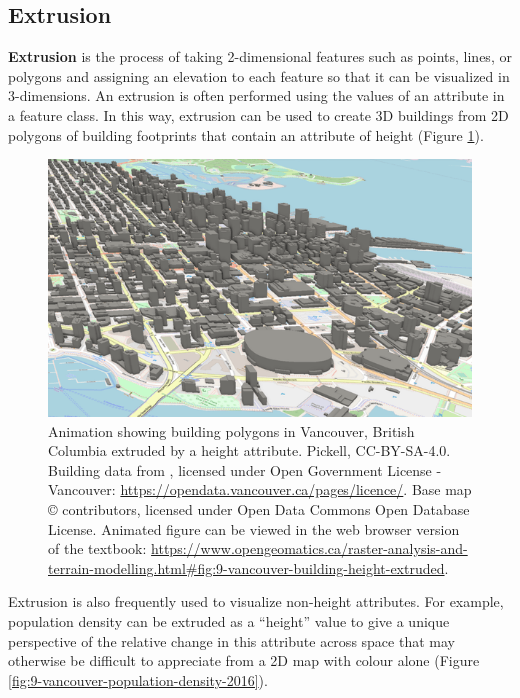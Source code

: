 \documentclass[
]{book}
\begin{document}
\subsection{Extrusion}\label{extrusion}

\textbf{Extrusion} is the process of taking 2-dimensional features such as points, lines, or polygons and assigning an elevation to each feature so that it can be visualized in 3-dimensions. An extrusion is often performed using the values of an attribute in a feature class. In this way, extrusion can be used to create 3D buildings from 2D polygons of building footprints that contain an attribute of height (Figure \ref{fig:9-vancouver-building-height-extruded}).



\begin{figure}
\includegraphics[width=0.75\linewidth]{images/09-vancouver-building-height-extruded-static} \caption{Animation showing building polygons in Vancouver, British Columbia extruded by a height attribute. Pickell, CC-BY-SA-4.0. Building data from \citep{city_of_vancouver_notitle_2009}, licensed under Open Government License - Vancouver: \url{https://opendata.vancouver.ca/pages/licence/}. Base map © \citep{openstreetmap_notitle_nodate} contributors, licensed under Open Data Commons Open Database License. Animated figure can be viewed in the web browser version of the textbook: \url{https://www.opengeomatics.ca/raster-analysis-and-terrain-modelling.html\#fig:9-vancouver-building-height-extruded}.}\label{fig:9-vancouver-building-height-extruded}
\end{figure}

Extrusion is also frequently used to visualize non-height attributes. For example, population density can be extruded as a ``height'' value to give a unique perspective of the relative change in this attribute across space that may otherwise be difficult to appreciate from a 2D map with colour alone (Figure \ref{fig:9-vancouver-population-density-2016}).
\end{document}
